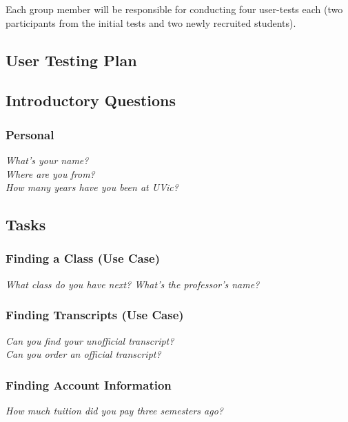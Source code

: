 \documentclass{article}
\begin{document}
Each group member will be responsible for conducting four user-tests each (two participants from the initial tests and two newly recruited students).


\pagebreak
\begin{appendices}

\section{User Testing Plan}\label{ap:utesting}

\subsection*{Introductory Questions}\label{introductory-questions}
\subsubsection*{Personal}\label{personal}
\emph{What's your name?} \\
\emph{Where are you from?} \\
\emph{How many years have you been at UVic?} \\
\subsection*{Tasks}\label{tasks}
\subsubsection*{Finding a Class (Use Case)}\label{finding-a-class}
\emph{What class do you have next? What's the professor's name?} \\
\subsubsection*{Finding Transcripts (Use Case)}\label{finding-transcripts}
\emph{Can you find your unofficial transcript?} \\
\emph{Can you order an official transcript?} \\
\subsubsection*{Finding Account Information}\label{finding-account-information}
\emph{How much tuition did you pay three semesters ago?} \\

\end{appendices}
\end{document}
